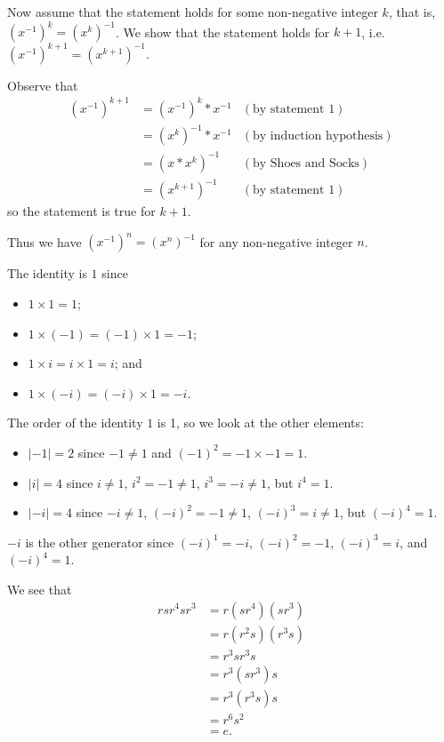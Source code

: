 \begin{questions}
    Now assume that the statement holds for some non-negative integer $k$, that is, $(x^{-1})^k = (x^k)^{-1}$. We show that the statement holds for $k + 1$, i.e. $(x^{-1})^{k+1} = (x^{k+1})^{-1}$.

    Observe that
    \begin{align*}
        (x^{-1})^{k+1} &= (x^{-1})^k \ast x^{-1} & (\text{by statement 1})\\
        &= (x^k)^{-1} \ast x^{-1} & (\text{by induction hypothesis})\\
        &= (x\ast x^k)^{-1} & (\text{by Shoes and Socks})\\
        &= (x^{k+1})^{-1} & (\text{by statement 1})
    \end{align*}
    so the statement is true for $k+1$.

    Thus we have $(x^{-1})^n = (x^n)^{-1}$ for any non-negative integer $n$.

    \item \begin{partquestions}{\roman*}
        \item The identity is $1$ since
        \begin{itemize}
            \item $1 \times 1 = 1$;
            \item $1 \times (-1) = (-1) \times 1 = -1$;
            \item $1 \times i = i \times 1 = i$; and
            \item $1 \times (-i) = (-i) \times 1 = -i$.
        \end{itemize}
        \item The order of the identity $1$ is 1, so we look at the other elements:
        \begin{itemize}
            \item $|-1| = 2$ since $-1 \neq 1$ and $(-1)^2 = -1 \times -1 = 1$.
            \item $|i| = 4$ since $i \neq 1$, $i^2 = -1 \neq 1$, $i^3 = -i \neq 1$, but $i^4 = 1$.
            \item $|-i| = 4$ since $-i \neq 1$, $(-i)^2 = -1 \neq 1$, $(-i)^3 = i \neq 1$, but $(-i)^4 = 1$.
        \end{itemize}
    \end{partquestions}

    \item $-i$ is the other generator since $(-i)^1 = -i$, $(-i)^2 = -1$, $(-i)^3 = i$, and $(-i)^4 = 1$.

    \item We see that
    \begin{align*}
        rsr^4sr^3 &= r(sr^4)(sr^3)\\
        &= r(r^2s)(r^3s)\\
        &= r^3sr^3s\\
        &= r^3(sr^3)s\\
        &= r^3(r^3s)s\\
        &= r^6s^2\\
        &= e.
    \end{align*}
\end{questions}


